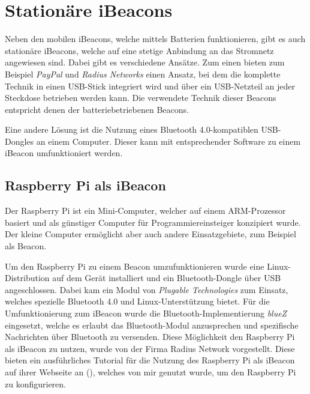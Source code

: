 \section{Stationäre iBeacons}
\label{sec:dataandmeasurement:stationarybeacon}
Neben den mobilen iBeacons, welche mittels Batterien funktionieren, gibt es auch stationäre iBeacons, welche auf eine stetige Anbindung an das Stromnetz angewiesen sind.
Dabei gibt es verschiedene Ansätze.
Zum einen bieten zum Beispiel \emph{PayPal} und \emph{Radius Networks} einen Ansatz, bei dem die komplette Technik in einen USB-Stick integriert wird und über ein USB-Netzteil an jeder Steckdose betrieben werden kann. Die verwendete Technik dieser Beacons entspricht denen der batteriebetriebenen Beacons.

Eine andere Lösung ist die Nutzung eines Bluetooth 4.0-kompatiblen USB-Dongles an einem Computer. Dieser kann mit entsprechender Software zu einem iBeacon umfunktioniert werden.

\subsection{Raspberry Pi als iBeacon}
\label{sec:dataandmeasurement:stationarybeacon:raspberrypi}
Der Raspberry Pi ist ein Mini-Computer, welcher auf einem ARM-Prozessor basiert und als günstiger Computer für Programmiereinsteiger konzipiert wurde. Der kleine Computer ermöglicht aber auch andere Einsatzgebiete, zum Beispiel als Beacon.

Um den Raspberry Pi zu einem Beacon umzufunktionieren wurde eine Linux-Distribution auf dem Gerät installiert und ein Bluetooth-Dongle über USB angeschlossen. Dabei kam ein Modul von \emph{Plugable Technologies} zum Einsatz, welches spezielle Bluetooth 4.0 und Linux-Unterstützung bietet.
Für die Umfunktionierung zum iBeacon wurde die Bluetooth-Implementierung \emph{blueZ} eingesetzt, welche es erlaubt das Bluetooth-Modul anzusprechen und spezifische Nachrichten über Bluetooth zu versenden.
Diese Möglichkeit den Raspberry Pi als iBeacon zu nutzen, wurde von der Firma Radius Network vorgestellt. Diese bieten ein ausführliches Tutorial für die Nutzung des Raspberry Pi als iBeacon auf ihrer Webseite an (\citet{radiusraspberry}), welches von mir genutzt wurde, um den Raspberry Pi zu konfigurieren.



